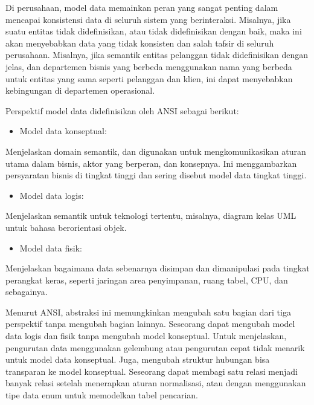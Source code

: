 \documentclass[]{book}
\providecommand{\tightlist}{%
  \setlength{\itemsep}{0pt}\setlength{\parskip}{0pt}}
\begin{document}
Di perusahaan, model data memainkan peran yang sangat penting dalam mencapai konsistensi data di seluruh sistem yang berinteraksi. Misalnya, jika suatu entitas tidak didefinisikan, atau tidak didefinisikan dengan baik, maka ini akan menyebabkan data yang tidak konsisten dan salah tafsir di seluruh perusahaan. Misalnya, jika semantik entitas pelanggan tidak didefinisikan dengan jelas, dan departemen bisnis yang berbeda menggunakan nama yang berbeda untuk entitas yang sama seperti pelanggan dan klien, ini dapat menyebabkan kebingungan di departemen operasional.

Perspektif model data didefinisikan oleh ANSI sebagai berikut:

\begin{itemize}
\tightlist
\item
  Model data konseptual:
\end{itemize}

Menjelaskan domain semantik, dan digunakan untuk mengkomunikasikan aturan utama dalam bisnis, aktor yang berperan, dan konsepnya. Ini menggambarkan persyaratan bisnis di tingkat tinggi dan sering disebut model data tingkat tinggi.

\begin{itemize}
\tightlist
\item
  Model data logis:
\end{itemize}

Menjelaskan semantik untuk teknologi tertentu, misalnya, diagram kelas UML untuk bahasa berorientasi objek.

\begin{itemize}
\tightlist
\item
  Model data fisik:
\end{itemize}

Menjelaskan bagaimana data sebenarnya disimpan dan dimanipulasi pada tingkat perangkat keras, seperti jaringan area penyimpanan, ruang tabel, CPU, dan sebagainya.

Menurut ANSI, abstraksi ini memungkinkan mengubah satu bagian dari tiga perspektif tanpa mengubah bagian lainnya. Seseorang dapat mengubah model data logis dan fisik tanpa mengubah model konseptual. Untuk menjelaskan, pengurutan data menggunakan gelembung atau pengurutan cepat tidak menarik untuk model data konseptual. Juga, mengubah struktur hubungan bisa transparan ke model konseptual. Seseorang dapat membagi satu relasi menjadi banyak relasi setelah menerapkan aturan normalisasi, atau dengan menggunakan tipe data enum untuk memodelkan tabel pencarian.
\end{document}
